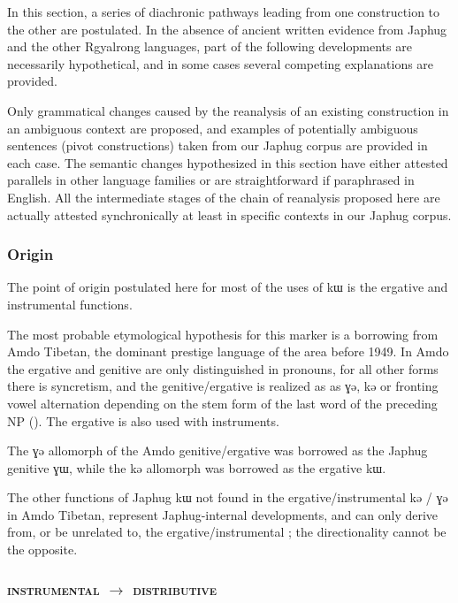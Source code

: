 \documentclass[oldfontcommands,oneside,a4paper,11pt]{article}
\newcommand{\ipa}[1]{{\phon #1}} %
\begin{document}
In this section, a series of diachronic pathways leading from one construction to the other are postulated. In the absence of ancient written evidence from Japhug and the other Rgyalrong languages, part of the following developments are necessarily hypothetical, and in some cases several competing explanations are provided.


Only grammatical changes caused by the reanalysis of an existing construction in an ambiguous context are proposed, and examples of potentially ambiguous sentences (pivot constructions) taken from our Japhug corpus are provided in each case. The semantic changes hypothesized in this section  have either attested parallels in other language families or are straightforward if paraphrased in English. All the intermediate stages of the chain of reanalysis proposed here are actually attested synchronically at least in specific contexts in our Japhug corpus.


 \subsubsection{Origin}
The point of origin postulated here for most of the uses of \ipa{kɯ} is the ergative and instrumental functions. 

The most probable etymological hypothesis for this marker is a borrowing from Amdo Tibetan, the dominant prestige  language of the area before 1949. In Amdo the ergative and genitive are only distinguished in pronouns, for all other forms there is syncretism, and the genitive/ergative is realized as as \ipa{ɣə}, \ipa{kə} or fronting vowel alternation depending on the stem form of the last word of the preceding NP (\citealt[62]{haller04themchen}). The ergative is also used with instruments.

The \ipa{ɣə} allomorph of the Amdo genitive/ergative was borrowed as the Japhug genitive \ipa{ɣɯ}, while the \ipa{kə} allomorph was borrowed  as the ergative \ipa{kɯ}. 

The other functions of Japhug \ipa{kɯ} not found in the ergative/instrumental \ipa{kə} / \ipa{ɣə} in Amdo Tibetan, represent Japhug-internal developments, and can only derive from, or be unrelated to, the  ergative/instrumental ; the directionality cannot be the opposite.



 \subsubsection{\textsc{instrumental} $\rightarrow$ \textsc{distributive} }
  
\end{document}
